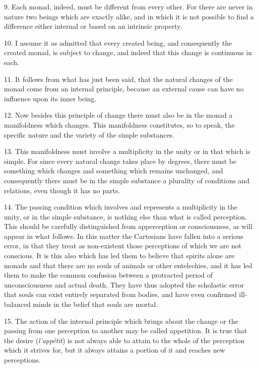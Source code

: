 9. Each monad, indeed, must be different from every other. For there
are never in nature two beings which are exactly alike, and in which
it is not possible to find a difference either internal or based on an
intrinsic property.

10. I assume it as admitted that every created being, and consequently
the created monad, is subject to change, and indeed that this change
is continuous in each.

11. It follows from what has just been said, that  the
natural changes of the monad come from an internal principle, because
an external cause can have no influence upon its inner being.

12. Now besides this principle of change there must also be in the
monad a manifoldness which changes. This manifoldness constitutes, so
to speak, the specific nature and the variety of the simple
substances.

13. This manifoldness must involve a multiplicity in the unity or in
that which is simple. For since every natural change takes place by
degrees, there must be something which changes and something which
remains unchanged, and consequently there must be in the simple
substance a plurality of conditions and relations, even though it has
no parts.

14. The passing condition which involves and represents a multiplicity
in the unity, or in the simple substance, is nothing else than what is
called perception. This should be carefully distinguished from
apperception or consciousness, as will appear in what follows. In this
matter the Cartesians have fallen into a serious error, in that they
treat as non-existent those perceptions of which we are not conscious.
It is this also which has led them to believe that spirits alone are
monads and that there are no souls of animals or other entelechies,
and it has led them to make the common confusion between a protracted
period of unconsciousness and actual death. They have thus adopted the
scholastic error that souls can exist entirely separated from bodies,
and have even confirmed ill-balanced minds in the belief that souls
are mortal.

15. The action of the internal principle which brings about the change
or the passing from one perception to another may be called
appetition. It is true that the desire (\textit{l'app\'etit}) is not
always able to attain to  the whole of the perception which
it strives for, but it always attains a portion of it and reaches new
perceptions.

